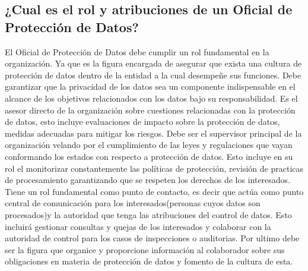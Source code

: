 \documentclass[stu, 11pt, letterpaper, donotrepeattitle, floatsintext, natbib]{apa7}
\begin{document}
 

\subsection{¿Cual es el rol y atribuciones de un Oficial de Protección de Datos?}

El Oficial de Protección de Datos debe cumplir un rol fundamental en la organización. Ya que es la  figura encargada de asegurar que exista una cultura de protección de datos dentro de la entidad a la cual desempeñe sus funciones. Debe garantizar que la privacidad de los datos sea un componente indispensable en el alcance de los objetivos relacionados con los datos bajo su responsabilidad.
 Es el asesor directo de la organización sobre cuestiones relacionadas con la protección de datos, esto incluye evaluaciones de impacto sobre la protección de datos, medidas adecuadas para mitigar los riesgos.
 Debe ser el supervisor principal de la organización velando por el cumplimiento de las leyes y regulaciones que vayan conformando los estados con respecto a protección de datos. Esto incluye en su rol el monitorizar constantemente las políticas de protección, revisión de practicas de procesamiento garantizando que se respeten los derechos de los interesados. 
 Tiene un rol fundamental como punto de contacto, es decir que actúa como punto central de comunicación para los interesados(personas cuyos datos son procesados)y la autoridad que tenga las atribuciones del control de datos. Esto incluirá gestionar consultas y quejas de los interesados y colaborar con la autoridad de control para los casos de inspecciones o auditorias.
 Por ultimo debe ser la figura que organice y proporcione información al colaborador sobre sus obligaciones en materia de protección de datos y fomento de la cultura de esta.
\end{document}
